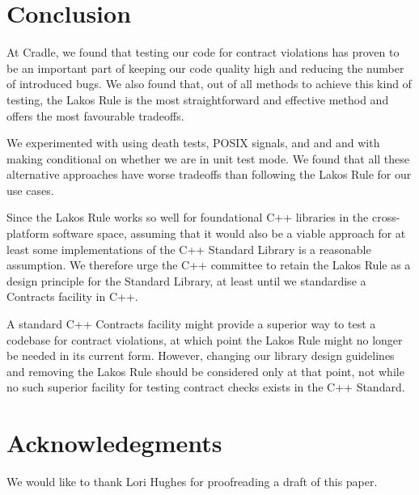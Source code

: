 \section{Conclusion}
At Cradle, we found that testing our code for contract violations has proven to be an important part of keeping our code quality high and reducing the number of introduced bugs. We also found that, out of all methods to achieve this kind of testing, the Lakos Rule is the most straightforward and effective method and offers the most favourable tradeoffs. 

We experimented with using death tests, POSIX signals, and  and  and with making  conditional on whether we are in unit test mode. We found that all these alternative approaches have worse tradeoffs than following the Lakos Rule for our use cases.

Since the Lakos Rule works so well for foundational C++ libraries in the cross-platform software space, assuming that it would also be a viable approach for at least some implementations of the C++ Standard Library is a reasonable assumption. We therefore urge the C++ committee to retain the Lakos Rule as a design principle for the Standard Library, at least until we standardise a Contracts facility in C++.

A standard C++ Contracts facility might provide a superior way to test a codebase for contract violations, at which point the Lakos Rule might no longer be needed in its current form. However, changing our library design guidelines and removing the Lakos Rule should be considered only at that point, not while no such superior facility for testing contract checks exists in the C++ Standard.



\section*{Acknowledegments}

We would like to thank Lori Hughes for proofreading a draft of this paper.

\renewcommand{\bibname}{References}



